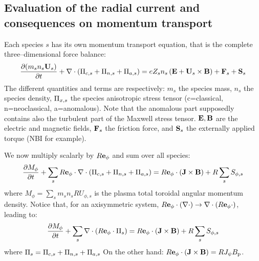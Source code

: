 \subsection{Evaluation of the radial current and consequences on momentum transport}
Each species $s$ has its own momentum transport equation, that is the complete three--dimensional force balance:
\begin{eqnarray}
\frac{\partial(m_s n_s\mathbf{U}_s)}{\partial{t}}+\nabla\cdot\left(\Pi_{c,s}
+\Pi_{n,s}+\Pi_{a,s}\right)=e Z_s n_s \left(\mathbf{E}+\mathbf{U}_s\times\mathbf{B}\right) +\mathbf{F}_s+\mathbf{S}_s
\label{momtranspeq3d}
\end{eqnarray}
The different quantities and terms are respectively: $m_s$ the species mass, $n_s$ the species density, $\Pi_{x,s}$ 
the species anisotropic stress tensor (c=classical, n=neoclassical, a=anomalous). Note that the anomalous part 
supposedly contains also the turbulent part of the Maxwell stress tensor. $\mathbf{E},\mathbf{B}$ are the electric and magnetic 
fields, $\mathbf{F}_s$ the friction force, and $\mathbf{S}_s$ the externally applied torque (NBI for example).

We now multiply scalarly  by $R\mathbf{e}_{\phi}$ and sum over all species:
\begin{eqnarray}
 \frac{\partial M_\phi}{\partial{t}}+\sum_s R\mathbf{e}_{\phi}\cdot
\nabla\cdot\left(\Pi_{c,s}
+\Pi_{n,s}+\Pi_{a,s}\right)=R\mathbf{e}_{\phi}\cdot\left(
\mathbf{J}\times\mathbf{B}\right) + R \sum_s S_{\phi,s}
\label{momtranspeq3drephi}
\end{eqnarray}
where $M_{\phi}=\sum_s m_s n_s R U_{\phi,s}$ is the plasma total toroidal angular momentum density.
Notice that, for an axisymmetric system, $R\mathbf{e}_{\phi}\cdot(\nabla\cdot) \rightarrow \nabla\cdot (R \mathbf{e}_{\phi}\cdot)$, leading to:
\begin{eqnarray}
 \frac{\partial M_\phi}{\partial{t}}+
\sum_s \nabla\cdot\left(R\mathbf{e}_{\phi}\cdot\Pi_s\right)=R\mathbf{e}_{\phi}\cdot\left(
\mathbf{J}\times\mathbf{B}\right)  + R \sum_s S_{\phi,s}
\label{momtranspeq3drephi2}
\end{eqnarray}
where $\Pi_s=\Pi_{c,s}+\Pi_{n,s}+\Pi_{a,s}$
On the other hand: $R\mathbf{e}_{\phi}\cdot\left(
\mathbf{J}\times\mathbf{B}\right)=R J_\psi B_{\rm p}$. 

